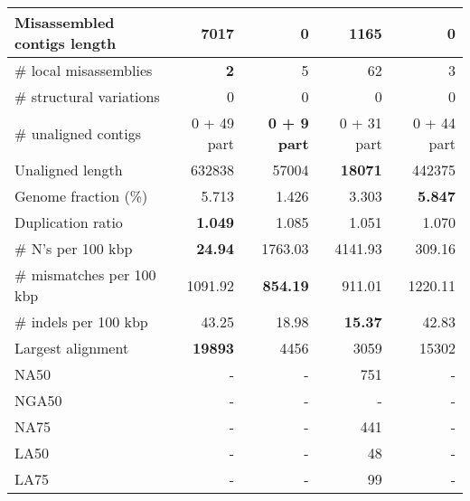 \documentclass[12pt,a4paper]{article}
\begin{document}
\begin{table}[ht]
\begin{center}
\begin{tabular}{|l*{4}{|r}|}
Misassembled contigs length & 7017 & {\bf 0} & 1165 & {\bf 0} \\ \hline
\# local misassemblies & {\bf 2} & 5 & 62 & 3 \\ \hline
\# structural variations & 0 & 0 & 0 & 0 \\ \hline
\# unaligned contigs & 0 + 49 part & {\bf 0 + 9 part} & 0 + 31 part & 0 + 44 part \\ \hline
Unaligned length & 632838 & 57004 & {\bf 18071} & 442375 \\ \hline
Genome fraction (\%) & 5.713 & 1.426 & 3.303 & {\bf 5.847} \\ \hline
Duplication ratio & {\bf 1.049} & 1.085 & 1.051 & 1.070 \\ \hline
\# N's per 100 kbp & {\bf 24.94} & 1763.03 & 4141.93 & 309.16 \\ \hline
\# mismatches per 100 kbp & 1091.92 & {\bf 854.19} & 911.01 & 1220.11 \\ \hline
\# indels per 100 kbp & 43.25 & 18.98 & {\bf 15.37} & 42.83 \\ \hline
Largest alignment & {\bf 19893} & 4456 & 3059 & 15302 \\ \hline
NA50 & - & - & 751 & - \\ \hline
NGA50 & - & - & - & - \\ \hline
NA75 & - & - & 441 & - \\ \hline
LA50 & - & - & 48 & - \\ \hline
LA75 & - & - & 99 & - \\ \hline
\end{tabular}
\end{center}
\end{table}
\end{document}
